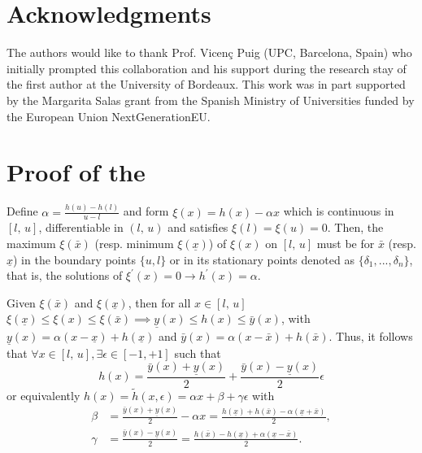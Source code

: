\documentclass[journal]{IEEEtran}
\begin{document}
\section*{Acknowledgments} 

The authors would like to thank Prof. Vicenç Puig (UPC, Barcelona, Spain) who initially prompted this collaboration and his support during the research stay of the first author at the University of Bordeaux.
This work was in part supported by the Margarita Salas grant from the Spanish Ministry of Universities funded by the European Union NextGenerationEU.


\appendices


\section{Proof of the }\label{app:appendix_a} 
Define $\alpha = \frac{h(u)-h(l)}{u-l}$ and form $\xi(x) =  h(x) - \alpha x$ which is continuous in $[l, \,u]$, differentiable in $(l, \, u)$ and satisfies $\xi(l) = \xi(u) = 0$. Then, the maximum $\xi(\bar{x})$ (resp. minimum $\xi(\underline{x})$) of $\xi(x)$ on $[l, \, u]$ must be for $\bar{x}$ (resp. $\underline{x}$) in the boundary points $\{u,l\}$ or in its stationary points denoted as $\{\delta_1,...,\delta_n\}$, that is, the solutions of  $\xi^\prime(x) = 0 \to h^\prime(x) = \alpha$. 

Given $\xi(\bar{x})$ and $\xi(\underline{x})$, then for all $x \in [l,\,u]$  $\xi(\underline{x}) \leq \xi(x) \leq \xi(\bar{x}) \implies \underline{y}(x) \leq  h(x) \leq  \bar{y}(x)$, with  $\underline{y}(x) =   \alpha(x-\underline{x}) + h(\underline{x})$ and  $\bar{y}(x) =  \alpha(x-\bar{x}) + h(\bar{x})$. Thus, it follows that $\forall x \in [l, \, u], \exists \epsilon \in [-1,+1]$ such that
$$h(x) = \frac{\bar{y}(x)+\underline{y}(x)}{2} + \frac{\bar{y}(x)-\underline{y}(x)}{2}\epsilon$$  or equivalently $h(x) = \tilde{h}(x,\epsilon) =  \alpha x + \beta + \gamma \epsilon$ with
\begin{equation*}
    \begin{aligned}
    \beta &= \frac{\bar{y}(x)+\underline{y}(x)}{2} - \alpha x = \frac{h(\underline{x})+h(\bar{x})-\alpha(\underline{x}+\bar{x})}{2}, \\
    \gamma &= \frac{\bar{y}(x)-\underline{y}(x)}{2} = \frac{h(\bar{x})-h(\underline{x})+\alpha(\underline{x}-\bar{x}) }{2}.
    \end{aligned}
\end{equation*}
\end{document}
